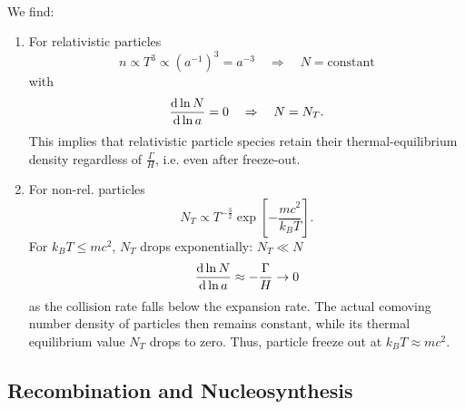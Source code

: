 \\
We find:
\begin{enumerate}
	\item For relativistic particles 
	\begin{equation*}
	n\propto T^3 \propto (a^{-1})^3 = a^{-3} \quad \Rightarrow \quad N=\text{constant}
	\end{equation*} 
	with
	\begin{equation}
		\frac{\mathrm{d} \ln N}{\mathrm{d} \ln a} =0 \quad \Rightarrow \quad N=N_T.
	\end{equation}
	This implies that relativistic particle species retain their thermal-equilibrium density regardless of $\frac{\Gamma}{H}$, i.e. even after freeze-out.
	\item For non-rel. particles 
	 \begin{equation*}
	 	N_T \propto T^{-\frac{3}{2}} \exp\left[-\frac{mc^2}{k_B T}\right].
	 \end{equation*}
	 For $k_B T\leq mc^2$, $N_T$ drops exponentially: $N_T  \ll N$
	 \begin{equation}
	 	\frac{\mathrm{d} \ln N}{\mathrm{d} \ln a} \approx -\frac{\Gamma}{H} \rightarrow 0
	 \end{equation}
	 as the collision rate falls below the expansion rate. The actual comoving number density of particles then remains constant, while its thermal equilibrium value $N_T$ drops to zero. Thus, particle freeze out at $k_B T \approx mc^2$.
\end{enumerate}


\subsection{Recombination and Nucleosynthesis}
